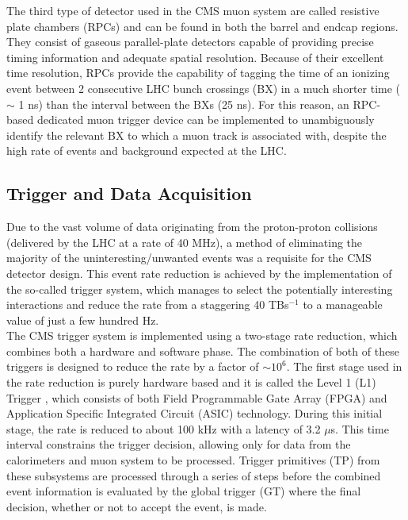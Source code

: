 The third type of detector used in the CMS muon system are called resistive plate chambers (RPCs) and can be found in both the barrel and endcap regions. They consist of gaseous parallel-plate detectors capable of providing precise timing information and adequate spatial resolution. Because of their excellent time resolution, RPCs provide the capability of tagging the time of an ionizing event between 2 consecutive LHC bunch crossings (BX) in a much shorter time ($\sim$ 1 ns) than the interval between the BXs (25 ns). For this reason, an RPC-based dedicated muon trigger device can be implemented to unambiguously identify the relevant BX to which a muon track is associated with, despite the high rate of events and background expected at the LHC.

\subsection{Trigger and Data Acquisition}

Due to the vast volume of data originating from the proton-proton collisions (delivered by the LHC at a rate of 40 MHz), a method of eliminating the majority of the uninteresting/unwanted events was a requisite for the CMS detector design. This event rate reduction is achieved by the implementation of the so-called trigger system, which manages to select the potentially interesting interactions and reduce the rate from a staggering 40 TBs$^{-1}$ to a manageable value of just a few hundred Hz.\\

The CMS trigger system is implemented using a two-stage rate reduction, which combines both a hardware and software phase. The combination of both of these triggers is designed to reduce the rate by a factor of $\sim10^6$. The first stage used in the rate reduction is purely hardware based and it is called the Level 1 (L1) Trigger \cite{L1T}, which consists of both Field Programmable Gate Array (FPGA) and Application Specific Integrated Circuit (ASIC) technology. During this initial stage, the rate is reduced to about 100 kHz with a latency of 3.2 ${\mu}$s. This time interval constrains the trigger decision, allowing only for data from the calorimeters and muon system to be processed. Trigger primitives (TP) from these subsystems are processed through a series of steps before the combined event information is evaluated by the global trigger (GT) where the final decision, whether or not to accept the event, is made.\\

